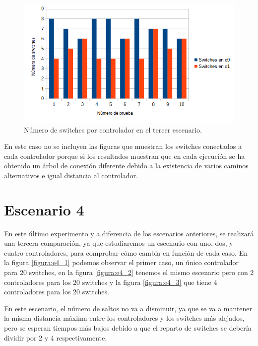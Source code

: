 \documentclass[a4paper, 12pt]{book}
\begin{document}
 	
 	\begin{figure}[H]
 		\centering
 		\includegraphics[width=16cm, keepaspectratio]{img/switchesporcontrollerescenario3}
 		\caption{Número de switches por controlador en el tercer escenario.}
 		\label{figura:switchesporcontrollerb4}
 	\end{figure}
 	
 	En este caso no se incluyen las figuras que muestran los switches conectados a cada controlador porque si los resultados muestran que en cada ejecución se ha obtenido un árbol de conexión diferente debido a la existencia de varios caminos alternativos e igual distancia al controlador.
	
	\clearpage
	\section{Escenario 4}
	
	En este último experimento y a diferencia de los escenarios anteriores, se realizará una tercera comparación, ya que estudiaremos un escenario con uno, dos, y cuatro controladores, para comprobar cómo cambia en función de cada caso.
	En la figura \ref{figura:e4_1} podemos observar el primer caso, un único controlador para 20 switches, en la figura \ref{figura:e4_2} tenemos el mismo escenario pero con 2 controladores para los 20 switches y la figura \ref{figura:e4_3} que  tiene 4 controladores para los 20 switches.
	
	En este escenario, el número de saltos no va a disminuir, ya que se va a mantener la misma distancia máxima entre los controladores y los switches más alejados, pero se esperan tiempos más bajos debido a que el reparto de switches se debería dividir por 2 y 4 respectivamente.
	
\end{document}
